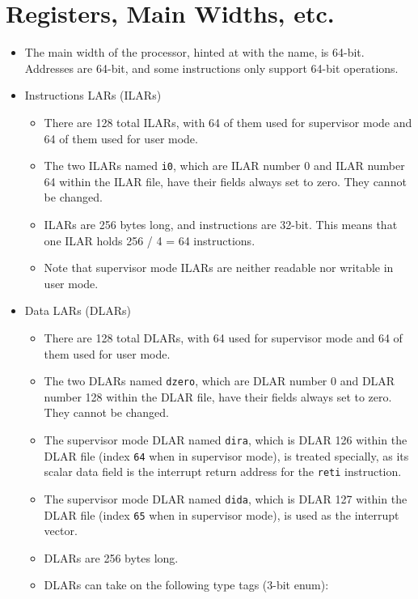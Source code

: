 \documentclass{article}
\begin{document}
\section{Registers, Main Widths, etc.}
	\begin{itemize}
	\item The main width of the processor, hinted at with the name, is
		64-bit.  Addresses are 64-bit, and some instructions only support
		64-bit operations.
	\item Instructions LARs (ILARs)
		\begin{itemize}
		\item There are 128 total ILARs, with 64 of them used for
			supervisor mode and 64 of them used for user mode.
		\item The two ILARs named \texttt{i0}, which are ILAR number 0 and
			ILAR number 64 within the ILAR file, have their fields always
			set to zero.  They cannot be changed.
		\item ILARs are 256 bytes long, and instructions are 32-bit.  This
			means that one ILAR holds 256 / 4 = 64 instructions.
		\item Note that supervisor mode ILARs are neither readable nor
			writable in user mode.
		\end{itemize}
	\item Data LARs (DLARs)
		\begin{itemize}
		\item There are 128 total DLARs, with 64 used for supervisor mode
			and 64 of them used for user mode.
		\item The two DLARs named \texttt{dzero}, which are DLAR number 0
			and DLAR number 128 within the DLAR file, have their fields
			always set to zero.  They cannot be changed.
		\item The supervisor mode DLAR named \texttt{dira}, which is DLAR
			126 within the DLAR file (index \texttt{64} when in supervisor
			mode), is treated specially, as its scalar data field is the
			interrupt return address for the \texttt{reti} instruction.
		\item The supervisor mode DLAR named \texttt{dida}, which is DLAR
			127 within the DLAR file (index \texttt{65} when in supervisor
			mode), is used as the interrupt vector.
		\item DLARs are 256 bytes long.
		\item DLARs can take on the following type tags (3-bit enum):
			\begin{itemize}

\end{itemize}
\end{itemize}
\end{itemize}
\end{document}
